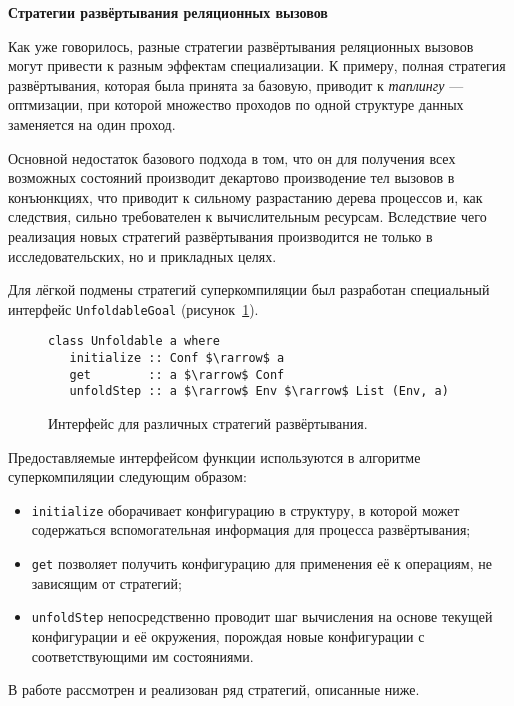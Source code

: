 \textbf{Стратегии развёртывания реляционных вызовов}

Как уже говорилось, разные стратегии развёртывания реляционных вызовов могут привести к разным
эффектам специализации. К примеру, полная стратегия развёртывания, которая была принята за базовую,
приводит к \emph{таплингу} \cite{tupling} --- оптмизации, при которой
множество проходов по одной структуре данных заменяется на один проход.


Основной недостаток базового подхода в том, что он для получения всех возможных состояний
производит декартово производение тел вызовов в конъюнкциях, что приводит
к сильному разрастанию дерева процессов и, как следствия, сильно требователен к вычислительным ресурсам.
Вследствие чего реализация новых стратегий развёртывания производится не только в исследовательских,
но и прикладных целях.

Для лёгкой подмены стратегий суперкомпиляции был разработан специальный интерфейс \lstinline{UnfoldableGoal}
(рисунок~\ref{fig:unfoldable}).
\begin{figure}[h!]
\begin{lstlisting}
class Unfoldable a where
   initialize :: Conf $\rarrow$ a
   get        :: a $\rarrow$ Conf
   unfoldStep :: a $\rarrow$ Env $\rarrow$ List (Env, a)
\end{lstlisting}
\caption{Интерфейс для различных стратегий развёртывания.}
\label{fig:unfoldable}
\end{figure}

Предоставляемые интерфейсом функции используются в алгоритме суперкомпиляции следующим образом:
\begin{itemize}
\item \lstinline{initialize} оборачивает конфигурацию в структуру, в которой может содержаться
      вспомогательная информация для процесса развёртывания;
\item \lstinline{get} позволяет получить конфигурацию для применения её к операциям, не зависящим
      от стратегий;
\item \lstinline{unfoldStep} непосредственно проводит шаг вычисления на основе текущей конфигурации
      и её окружения, порождая новые конфигурации с соответствующими им состояниями.
\end{itemize}

В работе рассмотрен и реализован ряд стратегий, описанные ниже.

